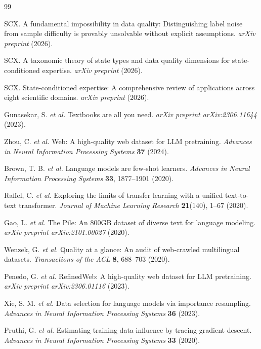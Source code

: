 \documentclass[11pt,twocolumn]{article}
\begin{document}
\begin{thebibliography}{99}

SCX. A fundamental impossibility in data quality: Distinguishing label noise from sample difficulty is provably unsolvable without explicit assumptions. \textit{arXiv preprint} (2026).

SCX. A taxonomic theory of state types and data quality dimensions for state-conditioned expertise. \textit{arXiv preprint} (2026).

SCX. State-conditioned expertise: A comprehensive review of applications across eight scientific domains. \textit{arXiv preprint} (2026).

Gunasekar, S. \textit{et al.} Textbooks are all you need. \textit{arXiv preprint arXiv:2306.11644} (2023).

Zhou, C. \textit{et al.} Web: A high-quality web dataset for LLM pretraining. \textit{Advances in Neural Information Processing Systems} \textbf{37} (2024).

Brown, T. B. \textit{et al.} Language models are few-shot learners. \textit{Advances in Neural Information Processing Systems} \textbf{33}, 1877--1901 (2020).

Raffel, C. \textit{et al.} Exploring the limits of transfer learning with a unified text-to-text transformer. \textit{Journal of Machine Learning Research} \textbf{21}(140), 1--67 (2020).

Gao, L. \textit{et al.} The Pile: An 800GB dataset of diverse text for language modeling. \textit{arXiv preprint arXiv:2101.00027} (2020).

Wenzek, G. \textit{et al.} Quality at a glance: An audit of web-crawled multilingual datasets. \textit{Transactions of the ACL} \textbf{8}, 688--703 (2020).

Penedo, G. \textit{et al.} RefinedWeb: A high-quality web dataset for LLM pretraining. \textit{arXiv preprint arXiv:2306.01116} (2023).

Xie, S. M. \textit{et al.} Data selection for language models via importance resampling. \textit{Advances in Neural Information Processing Systems} \textbf{36} (2023).

Pruthi, G. \textit{et al.} Estimating training data influence by tracing gradient descent. \textit{Advances in Neural Information Processing Systems} \textbf{33} (2020).


\end{thebibliography}
\end{document}
